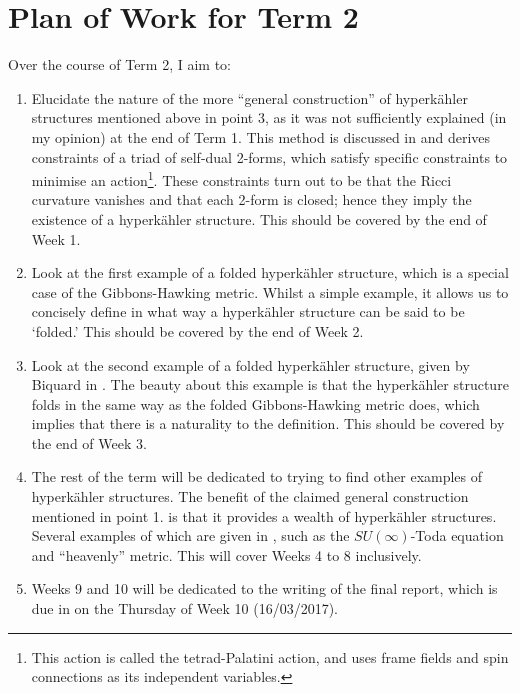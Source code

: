 \documentclass[a4paper,onecolumn,12pt]{article}
\theoremstyle{definition}
\theoremstyle{remark}
\newcommand{\HK}{hyperk\"ahler }
\begin{document}
\section{Plan of Work for Term 2}
Over the course of Term 2, I aim to:
\begin{enumerate}
	\item Elucidate the nature of the more ``general construction'' of \HK structures mentioned above in point 3, as it was not sufficiently explained (in my opinion) at the end of Term 1. This method is discussed in \cite{capovilla_1991, jacobson_1988} and derives constraints of a triad of self-dual 2-forms, which satisfy specific constraints to minimise an action\footnote{This action is called the tetrad-Palatini action, and uses frame fields and spin connections as its independent variables.}. These constraints turn out to be that the Ricci curvature vanishes and that each 2-form is closed; hence they imply the existence of a \HK structure. This should be covered by the end of Week 1.
	\item Look at the first example of a folded \HK structure, which is a special case of the Gibbons-Hawking metric. Whilst a simple example, it allows us to concisely define in what way a \HK structure can be said to be `folded.' This should be covered by the end of Week 2.
	\item Look at the second example of a folded \HK structure, given by Biquard in \cite{biquard_2015}. The beauty about this example is that the \HK structure folds in the same way as the folded Gibbons-Hawking metric does, which implies that there is a naturality to the definition. This should be covered by the end of Week 3.
	\item The rest of the term will be dedicated to trying to find other examples of \HK structures. The benefit of the claimed general construction mentioned in point 1. is that it provides a wealth of \HK structures. Several examples of which are given in \cite{hashimoto_1997}, such as the $SU(\infty)$-Toda equation and ``heavenly'' metric. This will cover Weeks 4 to 8 inclusively.
	\item Weeks 9 and 10 will be dedicated to the writing of the final report, which is due in on the Thursday of Week 10 (16/03/2017).
\end{enumerate}

 

\end{document}
